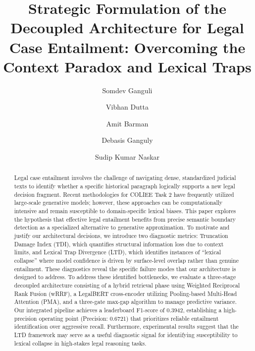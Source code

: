 \documentclass[sigconf]{acmart}
\newcommand{\rev}[1]{{\color{blue}#1}}
\begin{document}
\title{Strategic Formulation of the Decoupled Architecture for Legal Case Entailment: Overcoming the Context Paradox and Lexical Traps}

\author{Somdev Ganguli}

\author{Vibhan Dutta}

\author{Amit Barman}

\author{Debasis Ganguly}

\author{Sudip Kumar Naskar}

\renewcommand{\shortauthors}{JUNLLP Team}

\begin{abstract}
Legal case entailment involves the challenge of navigating dense, standardized judicial texts to identify whether a specific historical paragraph logically supports a new legal decision fragment. Recent methodologies for COLIEE Task 2 have frequently utilized large-scale generative models; however, these approaches can be computationally intensive and remain susceptible to domain-specific lexical biases. This paper explores the hypothesis that effective legal entailment benefits from precise semantic boundary detection as a specialized alternative to generative approximation. \rev{To motivate and justify our architectural decisions, we introduce two diagnostic metrics: Truncation Damage Index (TDI), which quantifies structural information loss due to context limits, and Lexical Trap Divergence (LTD), which identifies instances of ``lexical collapse'' where model confidence is driven by surface-level overlap rather than genuine entailment. These diagnostics reveal the specific failure modes that our architecture is designed to address.} To address these identified bottlenecks, we evaluate a three-stage decoupled architecture consisting of a hybrid retrieval phase using Weighted Reciprocal Rank Fusion (wRRF), a LegalBERT cross-encoder utilizing Pooling-based Multi-Head Attention (PMA), and a three-gate max-gap algorithm to manage predictive variance. Our integrated pipeline achieves a leaderboard F1-score of 0.3942\rev{, establishing a high-precision operating point (Precision: 0.6721) that prioritizes reliable entailment identification over aggressive recall}. Furthermore, experimental results suggest that the LTD \rev{framework} may serve as a useful \rev{diagnostic signal for identifying susceptibility to lexical collapse in} high-stakes legal reasoning tasks.
\end{abstract}
\end{document}
